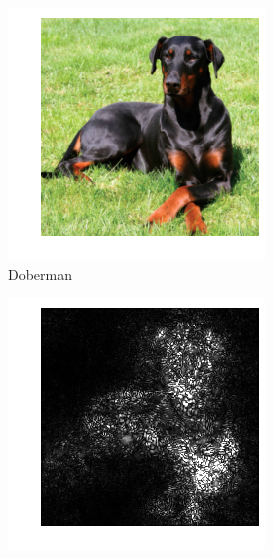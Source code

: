 \documentclass{article}
\begin{document}
    \begin{figure}[hbt!]
    	\centering
    	\hfil
    	\begin{subfigure}{.34\textwidth}
    		\includegraphics[width=\linewidth]{images/doberman.png}
    		\caption{Doberman}
    		\label{MLEDdet}
    	\end{subfigure}
    	\hfil
    	\begin{subfigure}{.34\textwidth}
    		\includegraphics[width=\linewidth]{images/doberman_saliency.png}

\end{subfigure}
\end{figure}
\end{document}
